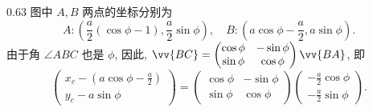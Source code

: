 \begin{frame}
\begin{columns}
\begin{column}{0.63\textwidth}
{图中 $A, B$ 两点的坐标分别为
\[
A: \left( \frac{a}{2}(\cos\phi - 1), \frac{a}{2}\sin\phi \right), \quad B: \left( a\cos\phi - \frac{a}{2}, a\sin\phi \right).
\]
由于角 $\angle ABC$ 也是 $\phi$, 因此, $\vv{BC} = \begin{pmatrix} \cos\phi & -\sin\phi \\ \sin\phi & \cos\phi \end{pmatrix} \vv{BA}$, 即
\[
\begin{pmatrix} x_c - \left(a\cos\phi - \frac{a}{2}\right) \\ y_c - a\sin\phi \end{pmatrix} = \begin{pmatrix} \cos\phi & -\sin\phi \\ \sin\phi & \cos\phi \end{pmatrix} \begin{pmatrix} -\frac{a}{2}\cos\phi \\ -\frac{a}{2}\sin\phi \end{pmatrix}.
\]
}


\end{column}
\end{columns}


\end{frame}


